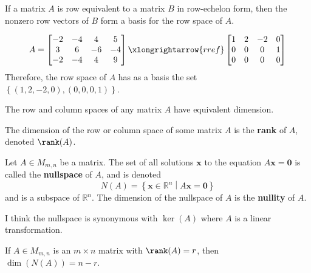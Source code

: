 \begin{theorem}
    If a matrix \(A\) is row equivalent to a matrix \(B\) in row-echelon form, then the nonzero row vectors of \(B\) form a basis for the row space of \(A\).
\end{theorem}
\begin{eg}
    \[
        A=\begin{bmatrix}
            -2 &-4  &4  &5   \\
             3&6  &-6  &-4   \\
             -2&-4  &4  &9   \\
        \end{bmatrix}\xlongrightarrow{rref} \begin{bmatrix}
            1 &2  &-2  &0   \\
             0&0  &0  &1   \\
             0&0  &0  &0   \\
        \end{bmatrix}
    \]
    Therefore, the row space of \(A\) has as a basis the set \(\left\{ (1,2,-2,0),(0,0,0,1) \right\} \).
\end{eg}
\begin{theorem}
    The row and column spaces of any matrix \(A\) have equivalent dimension.
\end{theorem}
\begin{definition}[Rank]
    The dimension of the row or column space of some matrix \(A\) is the \textbf{rank} of \(A\), denoted \(\rank (A)\).
\end{definition}
\begin{theorem}
    Let \(A\in M_{m,n}\) be a matrix. The set of all solutions \(\mathbf{x} \) to the equation \(A \mathbf{x} = \mathbf{0} \) is called the \textbf{nullspace} of \(A\), and is denoted
    \[
        N(A) = \left\{ \mathbf{x} \in \mathbb{R} ^n \middle| A \mathbf{x} =\mathbf{0}  \right\}
    \]
    and is a subspace of \(\mathbb{R}^n\). The dimension of the nullspace of \(A\) is the \textbf{nullity} of \(A\).
\end{theorem}
\begin{remark}
    I think the nullspace is synonymous with \(\ker (A)\) where \(A\) is a linear transformation.
\end{remark}
\begin{definition}
    If \(A\in M_{m,n}\) is an \(m \times n\) matrix with \(\rank (A)=r\), then \(\dim \left( N(A) \right) =n-r\).
\end{definition}
